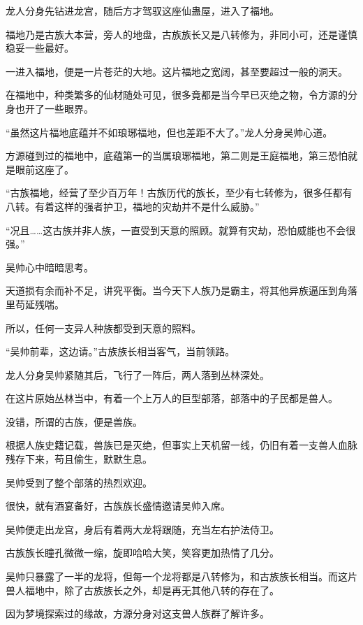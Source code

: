 
\begin{this_body}

龙人分身先钻进龙宫，随后方才驾驭这座仙蛊屋，进入了福地。

福地乃是古族大本营，旁人的地盘，古族族长又是八转修为，非同小可，还是谨慎稳妥一些最好。

一进入福地，便是一片苍茫的大地。这片福地之宽阔，甚至要超过一般的洞天。

在福地中，种类繁多的仙材随处可见，很多竟都是当今早已灭绝之物，令方源的分身也开了一些眼界。

“虽然这片福地底蕴并不如琅琊福地，但也差距不大了。”龙人分身吴帅心道。

方源碰到过的福地中，底蕴第一的当属琅琊福地，第二则是王庭福地，第三恐怕就是眼前这座了。

“古族福地，经营了至少百万年！古族历代的族长，至少有七转修为，很多任都有八转。有着这样的强者护卫，福地的灾劫并不是什么威胁。”

“况且……这古族并非人族，一直受到天意的照顾。就算有灾劫，恐怕威能也不会很强。”

吴帅心中暗暗思考。

天道损有余而补不足，讲究平衡。当今天下人族乃是霸主，将其他异族逼压到角落里苟延残喘。

所以，任何一支异人种族都受到天意的照料。

“吴帅前辈，这边请。”古族族长相当客气，当前领路。

龙人分身吴帅紧随其后，飞行了一阵后，两人落到丛林深处。

在这片原始丛林当中，有着一个上万人的巨型部落，部落中的子民都是兽人。

没错，所谓的古族，便是兽族。

根据人族史籍记载，兽族已是灭绝，但事实上天机留一线，仍旧有着一支兽人血脉残存下来，苟且偷生，默默生息。

吴帅受到了整个部落的热烈欢迎。

很快，就有酒宴备好，古族族长盛情邀请吴帅入席。

吴帅便走出龙宫，身后有着两大龙将跟随，充当左右护法侍卫。

古族族长瞳孔微微一缩，旋即哈哈大笑，笑容更加热情了几分。

吴帅只暴露了一半的龙将，但每一个龙将都是八转修为，和古族族长相当。而这片兽人福地中，除了古族族长之外，却是再无其他八转的存在了。

因为梦境探索过的缘故，方源分身对这支兽人族群了解许多。


\end{this_body}
